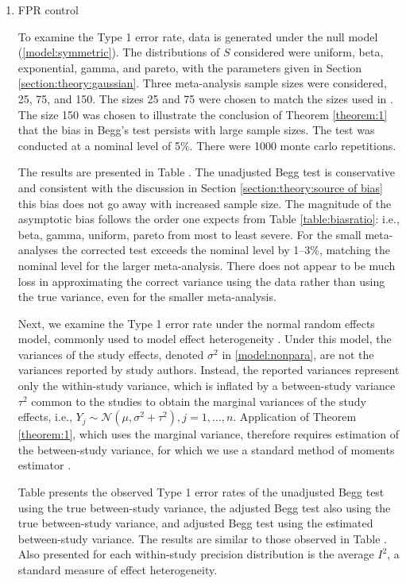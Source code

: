 \documentclass[12pt]{article}
\newcommand{\y}{Y}
\newcommand{\s}{S}
\begin{document}
      \begin{enumerate}
      
  \item FPR control
    
    To examine the Type 1 error rate, data is generated under the null
    model (\ref{model:symmetric}). The distributions of $\s$
    considered were uniform, beta, exponential, gamma, and pareto,
    with the parameters given in Section
    \ref{section:theory:gaussian}. Three meta-analysis sample sizes
    were considered, 25, 75, and 150. The sizes 25 and 75 were chosen
    to match the sizes used in \citet{begg1994a}. The size 150 was
    chosen to illustrate the conclusion of Theorem \ref{theorem:1} that
    the bias in Begg's test persists with large sample sizes. The test
    was conducted at a nominal level of 5\%. There were 1000 monte
    carlo repetitions.

    The results are presented in Table . The unadjusted
    Begg test is conservative and consistent with the discussion in
    Section \ref{section:theory:source of bias} this bias does not go away with increased
    sample size.  The magnitude of the asymptotic bias follows the
    order one expects from Table \ref{table:biasratio}: i.e., beta, gamma, uniform,
    pareto from most to least severe. For the small meta-analyses the
    corrected test exceeds the nominal level by 1--3\%, matching the
    nominal level for the larger meta-analysis. There does not appear
    to be much loss in approximating the correct variance using the
    data rather than using the true variance, even for the smaller
    meta-analysis.

    Next, we examine the Type 1 error rate under the normal
    random effects model, commonly used to model effect heterogeneity
    \citep{dersimonian1986}. Under this model, the variances of the
    study effects, denoted $\sigma^2$ in \eqref{model:nonpara}, are
    not the variances reported by study authors. Instead, the reported
    variances represent only the within-study variance, which is
    inflated by a between-study variance $\tau^2$ common to the
    studies to obtain the marginal variances of the study effects,
    i.e., $\y_j\sim
    \mathcal{N}(\mu,\sigma^2+\tau^2),j=1,\ldots,n$. Application of
    Theorem \ref{theorem:1}, which uses the marginal variance,
    therefore requires estimation of the between-study variance, for
    which we use a standard method of moments estimator
    \citep{dersimonian1986}.

    Table  presents
    the observed Type 1 error rates of the unadjusted Begg test using
    the true between-study variance, the adjusted Begg test also using
    the true between-study variance, and adjusted Begg test using the
    estimated between-study variance. The results are similar to those
    observed in Table . Also presented for each
    within-study precision distribution is the average $I^2$, a
    standard measure of effect heterogeneity.


\end{enumerate}
\end{document}
